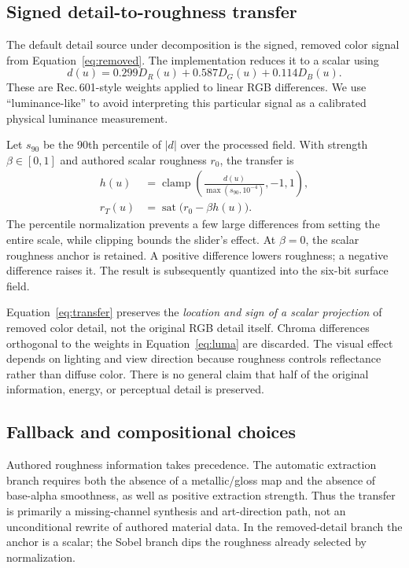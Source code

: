 \documentclass[11pt,letterpaper]{article}
\newcommand{\sat}{\operatorname{sat}}
\newcommand{\clamp}{\operatorname{clamp}}
\begin{document}
\subsection{Signed detail-to-roughness transfer}
The default detail source under decomposition is the signed, removed color signal from Equation~\eqref{eq:removed}. The implementation reduces it to a scalar using
\begin{equation}
d(u)=0.299D_R(u)+0.587D_G(u)+0.114D_B(u).
\label{eq:luma}
\end{equation}
These are Rec.\,601-style weights applied to linear RGB differences. We use ``luminance-like'' to avoid interpreting this particular signal as a calibrated physical luminance measurement.

Let $s_{90}$ be the 90th percentile of $|d|$ over the processed field. With strength $\beta\in[0,1]$ and authored scalar roughness $r_0$, the transfer is
\begin{align}
h(u)&=\clamp\!\left(\frac{d(u)}{\max(s_{90},10^{-4})},-1,1\right),\\
r_T(u)&=\sat\bigl(r_0-\beta h(u)\bigr).
\label{eq:transfer}
\end{align}
The percentile normalization prevents a few large differences from setting the entire scale, while clipping bounds the slider's effect. At $\beta=0$, the scalar roughness anchor is retained. A positive difference lowers roughness; a negative difference raises it. The result is subsequently quantized into the six-bit surface field.

Equation~\eqref{eq:transfer} preserves the \emph{location and sign of a scalar projection} of removed color detail, not the original RGB detail itself. Chroma differences orthogonal to the weights in Equation~\eqref{eq:luma} are discarded. The visual effect depends on lighting and view direction because roughness controls reflectance rather than diffuse color. There is no general claim that half of the original information, energy, or perceptual detail is preserved.

\subsection{Fallback and compositional choices}
Authored roughness information takes precedence. The automatic extraction branch requires both the absence of a metallic/gloss map and the absence of base-alpha smoothness, as well as positive extraction strength. Thus the transfer is primarily a missing-channel synthesis and art-direction path, not an unconditional rewrite of authored material data. In the removed-detail branch the anchor is a scalar; the Sobel branch dips the roughness already selected by normalization.
\end{document}
